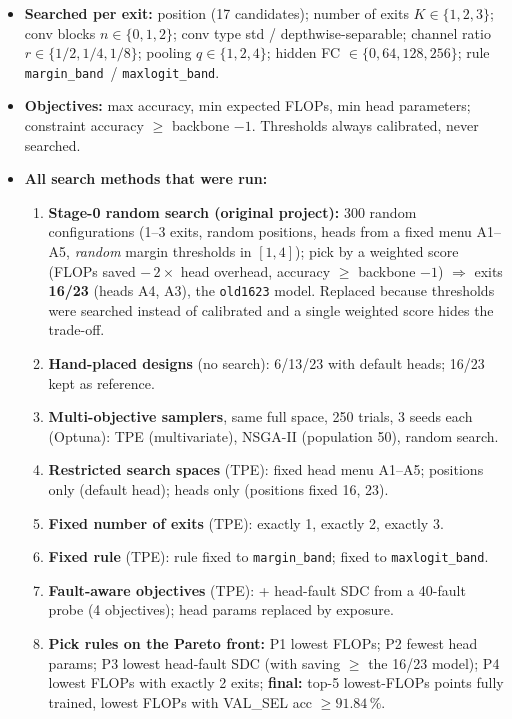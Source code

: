 \documentclass[10pt,a4paper]{article}
\newcommand{\meth}[1]{\texttt{#1}}
\newcommand{\ours}{\meth{margin\_band}}
\begin{document}
\begin{itemize}
  \item \textbf{Searched per exit:} position (17 candidates); number of exits $K\in\{1,2,3\}$; conv blocks
        $n\in\{0,1,2\}$; conv type std / depthwise-separable; channel ratio $r\in\{1/2,1/4,1/8\}$; pooling
        $q\in\{1,2,4\}$; hidden FC $\in\{0,64,128,256\}$; rule \ours\ / \meth{maxlogit\_band}.
  \item \textbf{Objectives:} max accuracy, min expected FLOPs, min head parameters; constraint accuracy
        $\ge$ backbone $-1$. Thresholds always calibrated, never searched.
  \item \textbf{All search methods that were run:}
  \begin{enumerate}
    \item \textbf{Stage-0 random search (original project):} 300 random configurations (1--3 exits, random
          positions, heads from a fixed menu A1--A5, \emph{random} margin thresholds in $[1,4]$); pick by a weighted
          score (FLOPs saved $-\,2\times$ head overhead, accuracy $\ge$ backbone $-1$) $\Rightarrow$ exits
          \textbf{16/23} (heads A4, A3), the \meth{old1623} model. Replaced because thresholds were searched instead
          of calibrated and a single weighted score hides the trade-off.
    \item \textbf{Hand-placed designs} (no search): 6/13/23 with default heads; 16/23 kept as reference.
    \item \textbf{Multi-objective samplers}, same full space, 250 trials, 3 seeds each (Optuna):
          TPE (multivariate), NSGA-II (population 50), random search.
    \item \textbf{Restricted search spaces} (TPE): fixed head menu A1--A5; positions only (default head);
          heads only (positions fixed 16, 23).
    \item \textbf{Fixed number of exits} (TPE): exactly 1, exactly 2, exactly 3.
    \item \textbf{Fixed rule} (TPE): rule fixed to \ours; fixed to \meth{maxlogit\_band}.
    \item \textbf{Fault-aware objectives} (TPE): + head-fault SDC from a 40-fault probe (4 objectives);
          head params replaced by exposure.
    \item \textbf{Pick rules on the Pareto front:} P1 lowest FLOPs; P2 fewest head params; P3 lowest head-fault
          SDC (with saving $\ge$ the 16/23 model); P4 lowest FLOPs with exactly 2 exits; \textbf{final:} top-5
          lowest-FLOPs points fully trained, lowest FLOPs with VAL\_SEL acc $\ge 91.84\,\%$.
  \end{enumerate}
\end{itemize}
\end{document}
